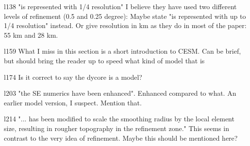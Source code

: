 \documentclass[12pt,oneside,a4paper]{article}%
\begin{document}
{\color{blue}{Replaced with ``marginal regions where the annual SMB is negative."}} \newline

l138 "is represented with 1/4 resolution" I believe they have used two different levels of refinement (0.5 and 0.25 degree): Maybe state "is represented with up to 1/4 resolution" instead. Or give resolution in km as they do in most of the paper: 55 km and 28 km. \newline

{\color{blue}{Used reviewers ``up to" suggestion.}} \newline

l159 What I miss in this section is a short introduction to CESM. Can be brief, but should bring the reader up to speed what kind of model that is \newline

{\color{blue}{Included a short introduction to CESM. Also moved language from the experimental design section in here, as well as include a statement that the ice sheet model is not dynamically active. Our hope is that by including this at the very top of the methods section, this partly addresses the reviewers concern that it is not clear we are not running with an active ice sheet.}} \newline

l174 Is it correct to say the dycore is a model? \newline

{\color{blue}{Reworded.}} \newline

l203 "the SE numerics have been enhanced". Enhanced compared to what. An earlier model version, I suspect. Mention that. \newline

{\color{blue}{Added: relative to the CESM2.0 release.}} \newline

l214 "... has been modified to scale the smoothing radius by the local element size, resulting in rougher topography in the refinement zone." This seems in contrast to the very idea of refinement. Maybe this should be mentioned here? \newline

{\color{blue}{I don't follow. How is rougher topography in the refinement zone inconsistent with the very idea of refinement? From our perspective it is a requirement of refinement -- finer dynamics permits rougher topography.}} \newline
\end{document}
